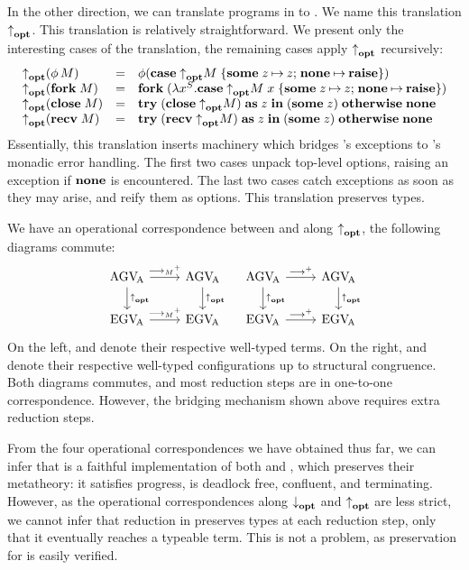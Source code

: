 \documentclass[acmsmall,review,anonymous]{acmart}
\begin{document}
In the other direction, we can translate programs in \affineAGV to \affineEGV. We name this translation $\mta{}$. This translation is relatively straightforward. We present only the interesting cases of the translation, the remaining cases apply $\mta{}$ recursively:
\[
  \begin{array}{lcl}
    \mta{\parens{\rvThread{\phi}{M}}}
    & = &
    \gvThread{\phi}{\parens{\gvCaseOpt{\mta{M}}{z}{z}{\gvRaise}}}
    \\
    \mta{\parens{\gvFork{M}}}
    & = &
    \gvFork{\parens{\gvAbs[S]{x}{\gvCaseOpt{\gvApp{\mta{M}}{x}}{z}{z}{\gvRaise}}}}
    \\
    \mta{\parens{\gvClose{M}}}
    & = &
    \gvTry{\parens{\gvClose{\mta{M}}}}{z}{\parens{\gvSome{z}}}{\gvNone}
    \\
    \mta{\parens{\gvRecv{M}}}
    & = &
    \gvTry{\parens{\gvRecv{\mta{M}}}}{z}{\parens{\gvSome{z}}}{\gvNone}
  \end{array}
\]
Essentially, this translation inserts machinery which bridges \affineEGV's exceptions to \affineAGV's monadic error handling. The first two cases unpack top-level options, raising an exception if $\gvNone$ is encountered. The last two cases catch exceptions as soon as they may arise, and reify them as options.
This translation preserves types.

We have an operational correspondence between \affineAGV and \affineEGV along $\mta{}$, \ie the following diagrams commute:
\[
  \begin{tikzcd}
    \affineAGV
    \rar{\gvRedArrPure^+}
    \dar{\mta{}}
    &
    \affineAGV
    \dar{\mta{}}
    \\
    \affineEGV
    \rar{\gvRedArrPure^+}
    &
    \affineEGV
  \end{tikzcd}
  \quad
  \begin{tikzcd}
    \affineAGV
    \rar{\gvRedArr^+}
    \dar{\mta{}}
    &
    \affineAGV
    \dar{\mta{}}
    \\
    \affineEGV
    \rar{\gvRedArr^+}
    &
    \affineEGV
  \end{tikzcd}
\]
On the left, \affineAGV and \affineEGV denote their respective well-typed terms. On the right, \affineAGV and \affineEGV denote their respective well-typed configurations up to structural congruence. Both diagrams commutes, and most reduction steps are in one-to-one correspondence. However, the bridging mechanism shown above requires extra reduction steps.

From the four operational correspondences we have obtained thus far, we can infer that \affineAGV is a faithful implementation of both \linearEGV and \affineEGV, which preserves their metatheory: it satisfies progress, is deadlock free, confluent, and terminating. However, as the operational correspondences along $\atm{}$ and $\mta{}$ are less strict, we cannot infer that reduction in \affineAGV preserves types at each reduction step, only that it eventually reaches a typeable term. This is not a problem, as preservation for \affineAGV is easily verified.
\end{document}

